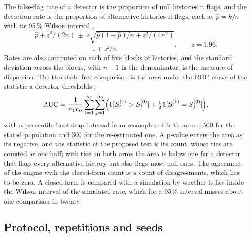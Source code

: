 The false-flag rate of a detector is the proportion of null histories it flags, and the detection rate is the proportion of alternative histories it flags, each as $\hat p=k/n$ with its 95\,\% Wilson interval \citep{wilson1927},
\begin{equation}
\frac{\hat p+z^2/(2n)\ \pm\ z\sqrt{\hat p(1-\hat p)/n+z^2/(4n^2)}}{1+z^2/n},\qquad z=1.96 .
\label{eq:wilson}
\end{equation}
Rates are also computed on each of five blocks of histories, and the standard deviation across the blocks, with $n-1$ in the denominator, is the measure of dispersion. The threshold-free comparison is the area under the ROC curve of the statistic a detector thresholds \citep{hanley1982},
\begin{equation}
\mathrm{AUC}=\frac{1}{n_1n_0}\sum_{i=1}^{n_1}\sum_{j=1}^{n_0}\Bigl(\mathbf{1}[S_i^{(1)}>S_j^{(0)}]+\tfrac12\mathbf{1}[S_i^{(1)}=S_j^{(0)}]\Bigr),
\label{eq:auc}
\end{equation}
with a percentile bootstrap interval from resamples of both arms \citep{efron1979}, 500 for the stated population and 300 for the re-estimated one. A p-value enters the area as its negative, and the statistic of the proposed test is its count, whose ties are counted as one half; with ties on both arms the area is below one for a detector that flags every alternative history but also flags most null ones. The agreement of the engine with the closed-form count is a count of disagreements, which has to be zero. A closed form is compared with a simulation by whether it lies inside the Wilson interval of the simulated rate, which for a 95\,\% interval misses about one comparison in twenty.

\subsection{Protocol, repetitions and seeds}
\label{sec:design-protocol}

